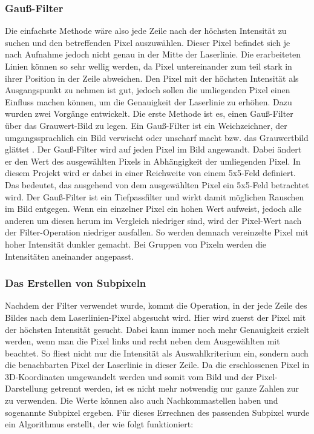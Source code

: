 	\subsubsection{Gauß-Filter}
	Die einfachste Methode wäre also jede Zeile nach der höchsten Intensität zu suchen und den betreffenden Pixel auszuwählen. Dieser Pixel befindet sich je nach Aufnahme jedoch nicht genau in der Mitte der Laserlinie. Die erarbeiteten Linien können so sehr \glqq wellig\grqq{} werden, da Pixel untereinander zum teil stark in ihrer Position in der Zeile abweichen. Den Pixel mit der höchsten Intensität als Ausgangspunkt zu nehmen ist gut, jedoch sollen die umliegenden Pixel einen Einfluss machen können, um die Genauigkeit der Laserlinie zu erhöhen. Dazu wurden zwei Vorgänge entwickelt. \newline
	Die erste Methode ist es, einen Gauß-Filter über das Grauwert-Bild zu legen. Ein Gauß-Filter ist ein Weichzeichner, der umgangssprachlich ein Bild verwischt oder unscharf macht bzw. das Grauwertbild glättet \citep[Vgl.][S. 134ff]{nischwitz_bildverarbeitung_2020}. Der Gauß-Filter wird auf jeden Pixel im Bild angewandt. Dabei ändert er den Wert des ausgewählten Pixels in Abhängigkeit der umliegenden Pixel. In diesem Projekt wird er dabei in einer Reichweite von einem 5x5-Feld definiert. Das bedeutet, das ausgehend von dem ausgewählten Pixel ein 5x5-Feld betrachtet wird. Der Gauß-Filter ist ein Tiefpassfilter und wirkt damit möglichen Rauschen im Bild entgegen. Wenn ein einzelner Pixel ein hohen Wert aufweist, jedoch alle anderen um diesen herum im Vergleich niedriger sind, wird der Pixel-Wert nach der Filter-Operation niedriger ausfallen. So werden demnach vereinzelte Pixel mit hoher Intensität dunkler gemacht. Bei Gruppen von Pixeln werden die Intensitäten aneinander angepasst.
	
	\subsubsection{Das Erstellen von Subpixeln}
	Nachdem der Filter verwendet wurde, kommt die Operation, in der jede Zeile des Bildes nach dem Laserlinien-Pixel abgesucht wird. Hier wird zuerst der Pixel mit der höchsten Intensität gesucht. Dabei kann immer noch mehr  Genauigkeit erzielt werden, wenn man die Pixel links und recht neben dem Ausgewählten mit beachtet. So fliest nicht nur die Intensität als Auswahlkriterium ein, sondern auch die benachbarten Pixel der Laserlinie in dieser Zeile. Da die erschlossenen Pixel in 3D-Koordinaten umgewandelt werden und somit vom Bild und der Pixel-Darstellung getrennt werden, ist es nicht mehr notwendig nur ganze Zahlen zur zu verwenden. Die Werte können also auch Nachkommastellen haben und sogenannte Subpixel ergeben. Für dieses Errechnen des passenden Subpixel wurde ein Algorithmus erstellt, der wie folgt funktioniert:
	
